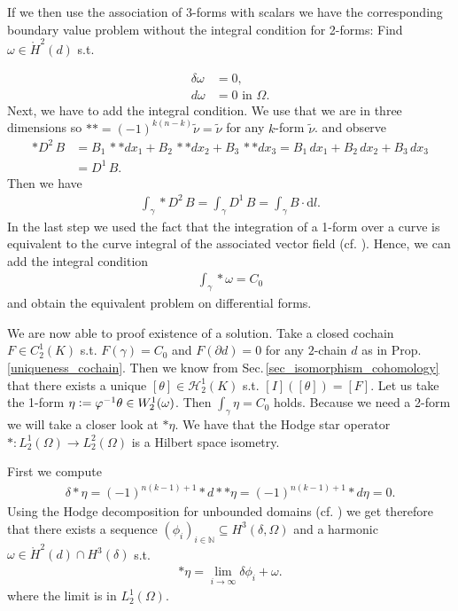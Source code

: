 \documentclass[12pt,a4paper]{article}
\theoremstyle{definition}
\begin{document}
If we then use the association of
3-forms with scalars we have the corresponding boundary value problem without
the integral condition for 
2-forms: Find $\omega \in \mathring{H}^2(d)$ s.t.

\begin{align}
    \delta \omega &= 0, \\ 
    d\omega  &= 0 \text{ in } \Omega.
\end{align}
Next, we have to add the integral condition. 
We use that we are in three dimensions so
$**=(-1)^{k(n-k)}\tilde{\nu} = \tilde{\nu}$ \cite[p.66]{arnold} for any
$k$-form $\tilde{\nu}$.
and observe
\begin{align*}
    *D^2 \, B  &= B_1 \, **dx_1 + B_2 \, **dx_2 + B_3\, **dx_3 
        = B_1 \, dx_1 + B_2 \, dx_2 + B_3\, dx_3\\ 
    &= D^1 \, B.
\end{align*}
Then we have 
\begin{align*}
    \int_\gamma * D^2\, B = \int_\gamma D^1\, B = \int_\gamma B \cdot \text{d}l.
\end{align*}
In the last step we used the fact that the integration of a 1-form over a
curve is equivalent to the curve integral of the associated vector field
(cf. \cite[Sec. 6.2.3]{arnold}). Hence, we can add the integral condition 
\begin{align}
    \int_\gamma *\omega = C_0 \label{integral_condition}
\end{align}
and obtain the equivalent problem on differential forms.


We are now able to proof existence of a 
solution. Take a closed cochain $F \in C^1_2(K)$ s.t. $F(\gamma) = C_0$ 
and 
$F(\partial d) = 0$ for any $2$-chain $d$ 
as in Prop.\,\ref{uniqueness_cochain}. Then we know from 
Sec.\,\ref{sec_isomorphism_cohomology} that 
there exists a unique $[\theta] \in \mathscr{H}_2^1(K)$ s.t. 
$[I]([\theta]) = [F]$. Let us take the 1-form $\eta \vcentcolon= 
\varphi^{-1} \theta \in W^1_2(\omega)$. Then $\int_\gamma \eta = C_0$ holds. 
Because we need a 2-form we will take a closer look at $*\eta$.
We have that the Hodge star operator $*: L^1_2(\Omega) \rightarrow 
L^2_2(\Omega)$ is a Hilbert space isometry. 


First we compute
\begin{align*}
    \delta *\eta = (-1)^{n(k-1)+1} *d**\eta = (-1)^{n(k-1)+1} *d\eta = 0.
\end{align*}
Using the Hodge decomposition for unbounded domains 
(cf. \cite[Lemma 1]{picard}) we get therefore that there exists 
a sequence  $(\phi_i)_{i\in \mathbb{N}} \subseteq H^3(\delta,\Omega)$ 
and a harmonic $\omega \in \mathring{H}^2(d) \cap H^3(\delta)$ s.t. 
\begin{align*}
    *\eta = \lim\limits_{i \rightarrow \infty} \delta \phi_i + \omega.
\end{align*}
where the limit is in $L^1_2(\Omega)$. 
\end{document}
